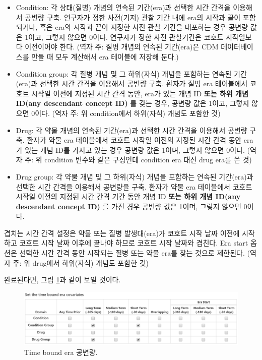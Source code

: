 \documentclass[10.5pt]{book}
\providecommand{\tightlist}{%
  \setlength{\itemsep}{0pt}\setlength{\parskip}{0pt}}
\theoremstyle{definition}
\theoremstyle{definition}
\theoremstyle{definition}
\theoremstyle{remark}
\begin{document}
\begin{itemize}
\tightlist
\item
  Condition: 각 상태(질병) 개념의 연속된 기간(era)과 선택한 시간 간격을
  이용해서 공변량 구축. 연구자가 정한 사전(기저) 관찰 기간 내에 era의
  시작과 끝이 포함되거나, 혹은 era의 시작과 끝이 지정한 사전 관찰 기간을
  내포하는 경우 공변량 값은 1이고, 그렇지 않으면 0이다. 연구자가 정한
  사전 관찰기간은 코호트 시작일보다 이전이어야 한다. (역자 주: 질병
  개념의 연속된 기간(era)은 CDM 데이터베이스를 만들 때 모두 계산해서 era
  테이블에 저장해 둔다.)
\item
  Condition group: 각 질병 개념 및 그 하위(자식) 개념을 포함하는 연속된
  기간 (era)과 선택한 시간 간격을 이용해서 공변량 구축. 환자가 질병 era
  테이블에서 코호트 시작일 이전에 지정된 시간 간격 동안, era가 있는 개념
  ID \textbf{또는 하위 개념 ID(any descendant concept ID)} 를 갖는 경우,
  공변량 값은 1이고, 그렇지 않으면 0이다. (역자 주: 위 condition에서
  하위(자식) 개념도 포함한 것)
\item
  Drug: 각 약물 개념의 연속된 기간(era)과 선택한 시간 간격을 이용해서
  공변량 구축. 환자가 약물 era 테이블에서 코호트 시작일 이전의 지정된
  시간 간격 동안 era가 있는 개념 ID를 가지고 있는 경우 공변량 값은
  1이며, 그렇지 않으면 0이다. (역자 주: 위 condition 변수와 같은
  구성인데 condition era 대신 drug era를 쓴 것)
\item
  Drug group: 각 약물 개념 및 그 하위(자식) 개념을 포함하는 연속된
  기간(era)과 선택한 시간 간격을 이용해서 공변량을 구축. 환자가 약물 era
  테이블에서 코호트 시작일 이전의 지정된 시간 간격 기간 동안 개념 ID
  \textbf{또는 하위 개념 ID(any descendant concept ID)} 를 가진 경우
  공변량 값은 1이며, 그렇지 않으면 0이다.
\end{itemize}

겹치는 시간 간격 설정은 약물 또는 질병 발생대(era)가 코호트 시작 날짜
이전에 시작하고 코호트 시작 날짜 이후에 끝나야 하므로 코호트 시작 날짜와
겹친다. Era start 옵션은 선택한 시간 간격 동안 시작되는 질병 또는 약물
era를 찾는 것으로 제한된다. (역자 주: 위 drug에서 하위(자식) 개념도
포함한 것)

완료된다면, 그림 \ref{fig:covariateSettings4}과 같이 보일 것이다.

\begin{figure}

{\centering \includegraphics[width=1\linewidth]{images/PatientLevelPrediction/covariateSettings4} 

}

\caption{Time bound era 공변량.}\label{fig:covariateSettings4}
\end{figure}
\end{document}
